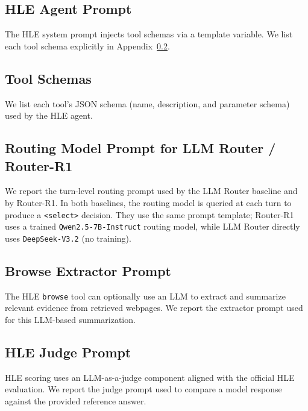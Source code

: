 \subsection{HLE Agent Prompt}
\label{app:prompts:hle}
The HLE system prompt injects tool schemas via a template variable. We list each tool schema explicitly in Appendix~\ref{app:tool_schemas}.



\subsection{Tool Schemas}
\label{app:tool_schemas}
We list each tool's JSON schema (name, description, and parameter schema) used by the HLE agent.





\subsection{Routing Model Prompt for LLM Router / Router-R1}
\label{app:prompts:routing}
We report the turn-level routing prompt used by the LLM Router baseline and by Router-R1. In both baselines, the routing model is queried at each turn to produce a \texttt{<select>} decision. They use the same prompt template; Router-R1 uses a trained \texttt{Qwen2.5-7B-Instruct} routing model, while LLM Router directly uses \texttt{DeepSeek-V3.2} (no training).



\subsection{Browse Extractor Prompt}
\label{app:prompts:browse}
The HLE \texttt{browse} tool can optionally use an LLM to extract and summarize relevant evidence from retrieved webpages. We report the extractor prompt used for this LLM-based summarization.


\subsection{HLE Judge Prompt}
\label{app:prompts:judge}
HLE scoring uses an LLM-as-a-judge component aligned with the official HLE evaluation. We report the judge prompt used to compare a model response against the provided reference answer.


